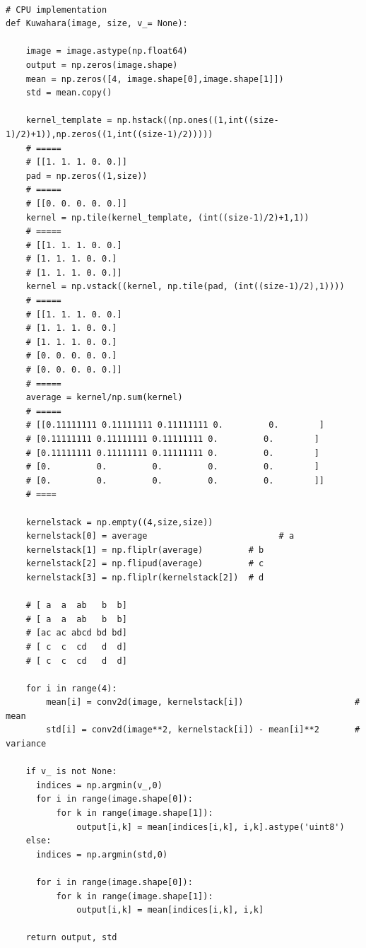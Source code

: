 \documentclass[a4paper,11pt]{article}
\theoremstyle{mytheor}
\begin{document}
\begin{lstlisting}[caption= Sample Python code -- gray scale RGB image 1D and 2D implementations.]

# CPU implementation
def Kuwahara(image, size, v_= None):

    image = image.astype(np.float64)
    output = np.zeros(image.shape)
    mean = np.zeros([4, image.shape[0],image.shape[1]])
    std = mean.copy()

    kernel_template = np.hstack((np.ones((1,int((size-1)/2)+1)),np.zeros((1,int((size-1)/2)))))
    # =====
    # [[1. 1. 1. 0. 0.]]
    pad = np.zeros((1,size))
    # =====
    # [[0. 0. 0. 0. 0.]]
    kernel = np.tile(kernel_template, (int((size-1)/2)+1,1))
    # =====
    # [[1. 1. 1. 0. 0.]
    # [1. 1. 1. 0. 0.]
    # [1. 1. 1. 0. 0.]]
    kernel = np.vstack((kernel, np.tile(pad, (int((size-1)/2),1))))
    # =====
    # [[1. 1. 1. 0. 0.]
    # [1. 1. 1. 0. 0.]
    # [1. 1. 1. 0. 0.]
    # [0. 0. 0. 0. 0.]
    # [0. 0. 0. 0. 0.]]
    # =====
    average = kernel/np.sum(kernel)
    # =====
    # [[0.11111111 0.11111111 0.11111111 0.         0.        ]
    # [0.11111111 0.11111111 0.11111111 0.         0.        ]
    # [0.11111111 0.11111111 0.11111111 0.         0.        ]
    # [0.         0.         0.         0.         0.        ]
    # [0.         0.         0.         0.         0.        ]]
    # ====
    
    kernelstack = np.empty((4,size,size)) 
    kernelstack[0] = average			              # a
    kernelstack[1] = np.fliplr(average)	        # b
    kernelstack[2] = np.flipud(average)	        # c
    kernelstack[3] = np.fliplr(kernelstack[2])	# d
    
    # [ a  a  ab   b  b]
    # [ a  a  ab   b  b]
    # [ac ac abcd bd bd]
    # [ c  c  cd   d  d]
    # [ c  c  cd   d  d]

    for i in range(4):
        mean[i] = conv2d(image, kernelstack[i]) 	                 # mean 
        std[i] = conv2d(image**2, kernelstack[i]) - mean[i]**2 		 # variance         

    if v_ is not None:
      indices = np.argmin(v_,0) 
      for i in range(image.shape[0]):
          for k in range(image.shape[1]):
              output[i,k] = mean[indices[i,k], i,k].astype('uint8')
    else:
      indices = np.argmin(std,0) 

      for i in range(image.shape[0]):
          for k in range(image.shape[1]):
              output[i,k] = mean[indices[i,k], i,k]

    return output, std


  
\end{lstlisting}
\end{document}
